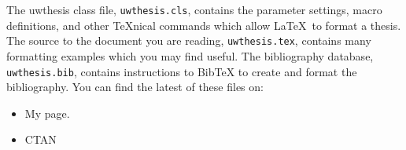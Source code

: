 \documentclass [11pt, proquest] {uwthesis}[2015/03/03]
\begin{document}
The uwthesis class file, {\tt uwthesis.cls}, contains the parameter settings,
macro definitions, and other \TeX nical commands which
allow \LaTeX\ to format a thesis.  
The source to
the document you are reading, {\tt uwthesis.tex},
contains many formatting examples
which you may find useful.
The bibliography database, {\tt uwthesis.bib}, contains instructions
to BibTeX to create and format the bibliography.
You can find the latest of these files on:

\begin{itemize}
\item My page.
\begin{description}
\item[] \verb%http://staff.washington.edu/fox/tex/uwthesis.html%
\end{description}

\item CTAN

\end{itemize}

\end{document}

